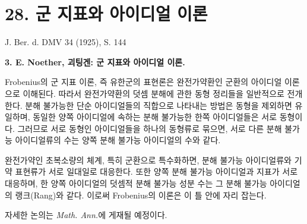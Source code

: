 
\section*{28. 군 지표와 아이디얼 이론}

\begin{center}
J. Ber. d. DMV 34 (1925), S. 144
\end{center}

\textbf{3. {\latinfont E. Noether}, 괴팅겐: 군 지표와 아이디얼 이론.}

Frobenius의 군 지표 이론, 즉 유한군의 표현론은 완전가약환인 군환의 아이디얼 이론으로 이해된다. 따라서 완전가약환의 덧셈 분해에 관한 동형 정리들을 일반적으로 전개한다. 분해 불가능한 단순 아이디얼들의 직합으로 나타내는 방법은 동형을 제외하면 유일하며, 동일한 양쪽 아이디얼에 속하는 분해 불가능한 한쪽 아이디얼들은 서로 동형이다. 그러므로 서로 동형인 아이디얼들을 하나의 동형류로 묶으면, 서로 다른 분해 불가능 아이디얼류의 수는 양쪽 분해 불가능 아이디얼의 수와 같다.

완전가약인 초복소량의 체계, 특히 군환으로 특수화하면, 분해 불가능 아이디얼류와 기약 표현류가 서로 일대일로 대응한다. 또한 양쪽 분해 불가능 아이디얼과 지표가 서로 대응하며, 한 양쪽 아이디얼의 덧셈적 분해 불가능 성분 수는 그 분해 불가능 아이디얼의 랭크(Rang)와 같다. 이로써 Frobenius의 이론은 이 틀 안에 자리 잡는다.

자세한 논의는 \emph{Math. Ann.}에 게재될 예정이다.
